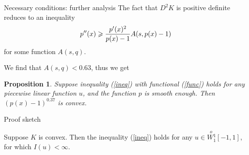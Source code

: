 \documentclass{beamer}\usepackage[]{graphicx}\usepackage[]{color}
\renewcommand{\ge}{\geqslant}
\newcommand{\Wf}{\stackrel{o\ }{W{}_1^1}}
\newtheorem{prop}{Proposition}
\begin{document}
\begin{frame}{Necessary conditions: further analysis}
The fact that $D^2 K$ is positive definite reduces to an inequality
$$p''(x) \ge {p'(x)^2 \over p(x) - 1} A(s, p(x) - 1)$$
for some function $A(s, q)$.

We find that $A(s, q) < 0.63$, thus we get
\begin{prop}
Suppose inequality (\ref{ineq}) with functional (\ref{func}) holds for any piecewise linear function $u$,
and the function $p$ is smooth enough.
Then $(p(x) - 1)^{0.37}$ is convex.
\end{prop}

\end{frame}

\begin{frame}{Proof sketch}

\begin{theorem}
Suppose $K$ is convex.
Then the inequality (\ref{ineq}) holds for any $u \in \Wf[-1, 1]$, for which $I(u) < \infty$.
\end{theorem}

\end{frame}
\end{document}

